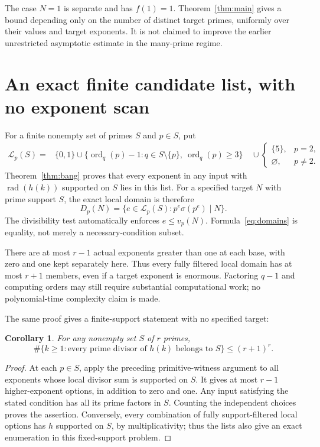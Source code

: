 \documentclass[11pt]{article}
\newtheorem{corollary}[theorem]{Corollary}
\DeclareMathOperator{\ord}{ord}
\DeclareMathOperator{\rad}{rad}
\begin{document}
The case $N=1$ is separate and has $f(1)=1$. Theorem~\ref{thm:main} gives a bound depending only on the number of distinct target primes, uniformly over their values and target exponents. It is not claimed to improve the earlier unrestricted asymptotic estimate in the many-prime regime.

\section{An exact finite candidate list, with no exponent scan}
For a finite nonempty set of primes $S$ and $p\in S$, put
\begin{align*}
 \mathcal L_p(S)={}&\{0,1\}\cup
 \{\ord_q(p)-1:q\in S\setminus\{p\},\ \ord_q(p)\ge3\}\
 &{}\cup\begin{cases}\{5\},&p=2,\\\varnothing,&p\ne2.\end{cases}
\end{align*}
Theorem~\ref{thm:bang} proves that every exponent in any input with $\rad(h(k))$ supported on $S$ lies in this list. For a specified target $N$ with prime support $S$, the exact local domain is therefore
\begin{equation}\label{eq:domains}
 \boxed{D_p(N)=\{e\in\mathcal L_p(S):p^e\sigma(p^e)\mid N\}.}
\end{equation}
The divisibility test automatically enforces $e\le v_p(N)$. Formula~\eqref{eq:domains} is equality, not merely a necessary-condition subset.

There are at most $r-1$ actual exponents greater than one at each base, with zero and one kept separately here. Thus every fully filtered local domain has at most $r+1$ members, even if a target exponent is enormous. Factoring $q-1$ and computing orders may still require substantial computational work; no polynomial-time complexity claim is made.

The same proof gives a finite-support statement with no specified target:
\begin{corollary}
For any nonempty set $S$ of $r$ primes,
\[
 \#\{k\ge1:\text{every prime divisor of }h(k)\text{ belongs to }S\}
 \le(r+1)^r.
\]
\end{corollary}
\begin{proof}
At each $p\in S$, apply the preceding primitive-witness argument to all exponents whose local divisor sum is supported on $S$. It gives at most $r-1$ higher-exponent options, in addition to zero and one. Any input satisfying the stated condition has all its prime factors in $S$. Counting the independent choices proves the assertion. Conversely, every combination of fully support-filtered local options has $h$ supported on $S$, by multiplicativity; thus the lists also give an exact enumeration in this fixed-support problem.
\end{proof}
\end{document}
